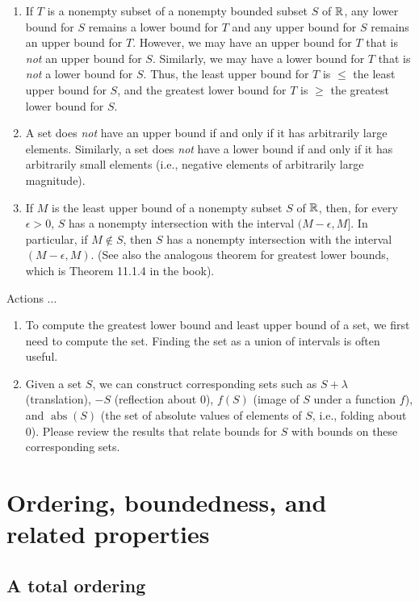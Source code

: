 \documentclass{amsart}
\begin{document}
\begin{enumerate}
\item If $T$ is a nonempty subset of a nonempty bounded subset $S$ of
  $\mathbb{R}$, any lower bound for $S$ remains a lower bound for $T$ and any
  upper bound for $S$ remains an upper bound for $T$. However, we may
  have an upper bound for $T$ that is {\em not} an upper bound for
  $S$. Similarly, we may have a lower bound for $T$ that is {\em not}
  a lower bound for $S$. Thus, the least upper bound for $T$ is $\le$
  the least upper bound for $S$, and the greatest lower bound for $T$
  is $\ge$ the greatest lower bound for $S$.
\item A set does {\em not} have an upper bound if and only if it has
  arbitrarily large elements. Similarly, a set does {\em not} have a
  lower bound if and only if it has arbitrarily small elements (i.e.,
  negative elements of arbitrarily large magnitude).
\item If $M$ is the least upper bound of a nonempty subset $S$ of
  $\mathbb{R}$, then, for every $\epsilon > 0$, $S$ has a nonempty
  intersection with the interval $(M - \epsilon,M]$. In particular, if
  $M \notin S$, then $S$ has a nonempty intersection with the interval
  $(M - \epsilon, M)$. (See also the analogous theorem for greatest
  lower bounds, which is Theorem 11.1.4 in the book).
\end{enumerate}

Actions ...

\begin{enumerate}
\item To compute the greatest lower bound and least upper bound of a
  set, we first need to compute the set. Finding the set as a union of
  intervals is often useful.
\item Given a set $S$, we can construct corresponding sets such as $S
  + \lambda$ (translation), $-S$ (reflection about $0$), $f(S)$ (image
  of $S$ under a function $f$), and $\operatorname{abs}(S)$ (the set
  of absolute values of elements of $S$, i.e., folding about
  $0$). Please review the results that relate bounds for $S$ with
  bounds on these corresponding sets.
\end{enumerate}

\section{Ordering, boundedness, and related properties}

\subsection{A total ordering}
\end{document}
